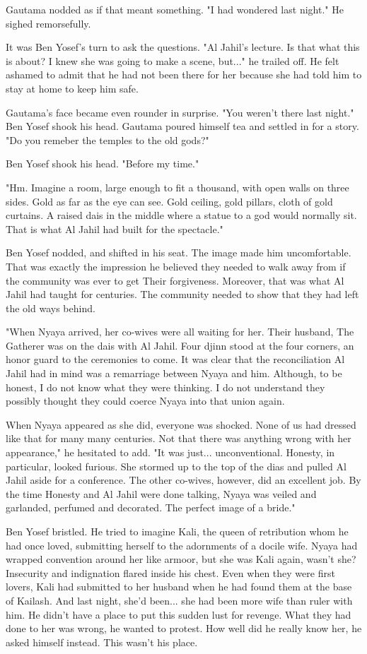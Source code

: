\documentclass{amsart}
\begin{document}
Gautama nodded as if that meant something. "I had wondered last night." He sighed remorsefully.

It was Ben Yosef's turn to ask the questions. "Al Jahil's lecture. Is that what this is about? I knew she was going to make a scene, but..." he trailed off. He felt ashamed to admit that he had not been there for her because she had told him to stay at home to keep him safe. 

Gautama's face became even rounder in surprise. "You weren't there last night." Ben Yosef shook his head. Gautama poured himself tea and settled in for a story. "Do you remeber the temples to the old gods?" 

Ben Yosef shook his head. "Before my time." 

"Hm. Imagine a room, large enough to fit a thousand, with open walls on three sides. Gold as far as the eye can see. Gold ceiling, gold pillars, cloth of gold curtains. A raised dais in the middle where a statue to a god would normally sit. That is what Al Jahil had built for the spectacle."

Ben Yosef nodded, and shifted in his seat. The image made him uncomfortable. That was exactly the impression he believed they needed to walk away from if the community was ever to get Their forgiveness. Moreover, that was what Al Jahil had taught for centuries. The community needed to show that they had left the old ways behind. 

"When Nyaya arrived, her co-wives were all waiting for her. Their husband, The Gatherer was on the dais with Al Jahil. Four djinn stood at the four corners, an honor guard to the ceremonies to come. It was clear that the reconciliation Al Jahil had in mind was a remarriage between Nyaya and him. Although, to be honest, I do not know what they were thinking. I do not understand they possibly thought they could coerce Nyaya into that union again.

When Nyaya appeared as she did, everyone was shocked. None of us had dressed like that for many many centuries. Not that there was anything wrong with her appearance," he hesitated to add. "It was just... unconventional. Honesty, in particular, looked furious. She stormed up to the top of the dias and pulled Al Jahil aside for a conference. The other co-wives, however, did an excellent job. By the time Honesty and Al Jahil were done talking, Nyaya was veiled and garlanded, perfumed and decorated. The perfect image of a bride."

Ben Yosef bristled. He tried to imagine Kali, the queen of retribution whom he had once loved, submitting herself to the adornments of a docile wife. Nyaya had wrapped convention around her like armoor, but she was Kali again, wasn't she? Insecurity and indignation flared inside his chest. Even when they were first lovers, Kali had submitted to her husband when he had found them at the base of Kailash. And last night, she'd been... she had been more wife than ruler with him. He didn't have a place to put this sudden lust for revenge. What they had done to her was wrong, he wanted to protest. How well did he really know her, he asked himself instead. This wasn't his place.
\end{document}

